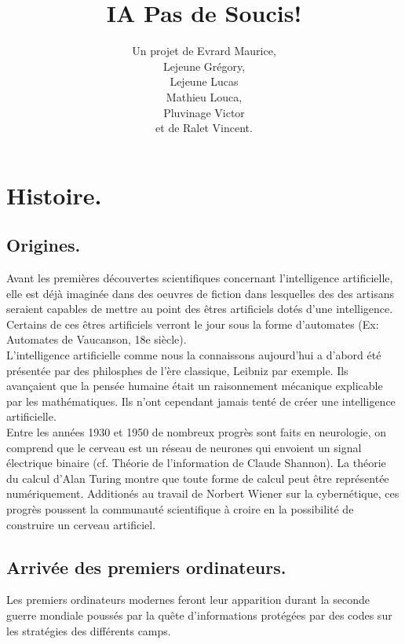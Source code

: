 \documentclass[a4paper, 12pt]{article}
\title{IA Pas de Soucis!}
\author{Un projet de Evrard Maurice,\\ Lejeune Grégory,\\ Lejeune Lucas \\ Mathieu Louca,\\ Pluvinage Victor\\ et de Ralet Vincent.}
\numberwithin{equation}{subsection}
\begin{document}
\maketitle
\newpage

\newpage
\section{Histoire.}
\subsection{Origines.}
Avant les premières découvertes scientifiques concernant l'intelligence artificielle, elle est déjà imaginée dans des oeuvres de fiction dans lesquelles des des artisans seraient capables de mettre au point des êtres artificiels dotés d'une intelligence. Certains de ces êtres artificiels verront le jour sous la forme d'automates (Ex: Automates de Vaucanson, 18e siècle).\\

L'intelligence artificielle comme nous la connaissons aujourd'hui a d'abord été présentée par des philosphes de l'ère classique, Leibniz par exemple. Ils avançaient que la pensée humaine était un raisonnement mécanique explicable par les mathématiques. Ils n'ont cependant jamais tenté de créer une intelligence artificielle.\\

Entre les années 1930 et 1950 de nombreux progrès sont faits en neurologie, on comprend que le cerveau est un réseau de neurones qui envoient un signal électrique binaire (cf. Théorie de l'information de Claude Shannon). La théorie du calcul d'Alan Turing montre que toute forme de calcul peut être représentée numériquement. Additionés au travail de Norbert Wiener sur la cybernétique, ces progrès poussent la communauté scientifique à croire en la possibilité de construire un cerveau artificiel.
\subsection{Arrivée des premiers ordinateurs.}
Les premiers ordinateurs modernes feront leur apparition durant la seconde guerre mondiale poussés par la quête d'informations protégées par des codes sur les stratégies des différents camps.
\end{document}
